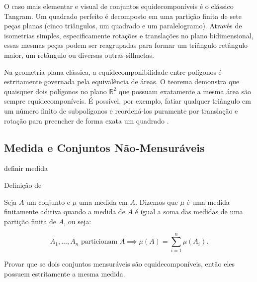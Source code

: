 \begin{exemplo}[Tangram]
    O caso mais elementar e visual de conjuntos equidecomponíveis é o clássico Tangram. Um quadrado perfeito é decomposto em uma partição finita de sete peças planas (cinco triângulos, um quadrado e um paralelogramo). Através de isometrias simples, especificamente rotações e translações no plano bidimensional, essas mesmas peças podem ser reagrupadas para formar um triângulo retângulo maior, um retângulo ou diversas outras silhuetas.

    
\end{exemplo}

\begin{exemplo}
    Na geometria plana clássica, a equidecomponibilidade entre polígonos é estritamente governada pela equivalência de áreas. O teorema demonstra que quaisquer dois polígonos no plano \(\mathbb{R}^2\) que possuam exatamente a mesma área são sempre equidecomponíveis. É possível, por exemplo, fatiar qualquer triângulo em um número finito de subpolígonos e reordená-los puramente por translação e rotação para preencher de forma exata um quadrado \parencite[p.~90]{wapner2007}.
\end{exemplo}

\subsection{Medida e Conjuntos Não-Mensuráveis}
\label{subsec:medida}

\begin{definicao}[Medida]
    \label{def:medida}
    definir medida
\end{definicao}

Definição de \textcite{terra2020}

\begin{definicao}
    \label{def:medida_aditiva}
    Seja \(A\) um conjunto e \(\mu\) uma medida em \(A\). Dizemos que \(\mu\) é uma medida finitamente aditiva quando a medida de \(A\) é igual a soma das medidas de uma partição finita de \(A\), ou seja:

    \[
        A_1, \dots, A_n \text{ particionam } A \implies \mu (A) = \sum_{i=1}^{n} \mu (A_i).
    \]

\end{definicao}

\begin{proposicao}
    \label{prop:medida_equidecomponiveis}
    Provar que se dois conjuntos mensuráveis são equidecomponíveis, então eles possuem estritamente a mesma medida.
\end{proposicao}


